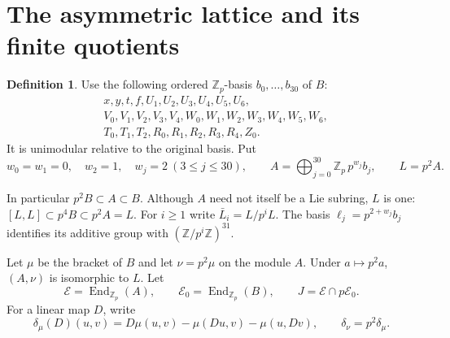 \documentclass[11pt]{article}
\theoremstyle{definition}\newtheorem{definition}[theorem]{Definition}
\theoremstyle{remark}\newtheorem{remark}[theorem]{Remark}
\DeclareMathOperator{\End}{End}
\newcommand{\Zp}{\mathbb Z_p}
\newcommand{\EE}{\mathcal E}
\begin{document}
\section{The asymmetric lattice and its finite quotients}
\begin{definition}\label{def:A}
Use the following ordered $\Zp$-basis $b_0,\ldots,b_{30}$ of $B$:
\begin{align*}
&x,y,t,f,U_1,U_2,U_3,U_4,U_5,U_6,\\
&V_0,V_1,V_2,V_3,V_4,W_0,W_1,W_2,W_3,W_4,W_5,W_6,\\
&T_0,T_1,T_2,R_0,R_1,R_2,R_3,R_4,Z_0.
\end{align*}
It is unimodular relative to the original basis. Put
\[
 w_0=w_1=0,\quad w_2=1,\quad w_j=2\ (3\le j\le30),
 \qquad A=\bigoplus_{j=0}^{30}\Zp\,p^{w_j}b_j,
 \qquad L=p^2 A.
\]
\end{definition}
In particular $p^2B\subset A\subset B$. Although $A$ need not itself be a
Lie subring, $L$ is one: $[L,L]\subset p^4B\subset p^2A=L$.
For $i\ge1$ write $\bar L_i=L/p^iL$.
The basis $\ell_j=p^{2+w_j}b_j$ identifies its additive group with
$(\mathbb Z/p^i\mathbb Z)^{31}$.

Let $\mu$ be the bracket of $B$ and let $\nu=p^2\mu$ on the module $A$.
Under $a\mapsto p^2a$, $(A,\nu)$ is isomorphic to $L$.
Let
\[
 \EE=\End_{\Zp}(A),\qquad \EE_0=\End_{\Zp}(B),\qquad
 J=\EE\cap p\EE_0.
\]
For a linear map $D$, write
\[
 \delta_\mu(D)(u,v)=D\mu(u,v)-\mu(Du,v)-\mu(u,Dv),
 \qquad\delta_\nu=p^2\delta_\mu.
\]
\end{document}
